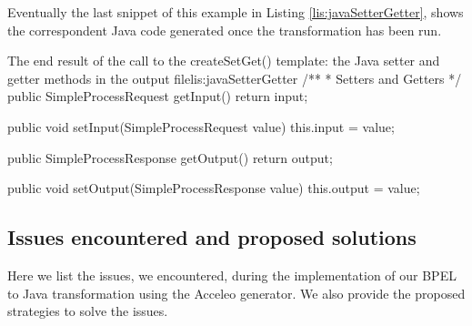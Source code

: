 Eventually the last snippet of this example in Listing \ref{lis:javaSetterGetter}, shows the correspondent Java code generated once the transformation has been run.

\begin{center}
  \begin{minipage}{1\textwidth}
    \begin{java-code}{The end result of the call to the createSetGet() template: the Java setter and getter methods in the output file}{lis:javaSetterGetter}
    /**
     * Setters and Getters    
     */
public SimpleProcessRequest getInput() {
	return input;
}

public void setInput(SimpleProcessRequest value) { 
	this.input = value;
}

public SimpleProcessResponse getOutput() {
	return output;
}

public void setOutput(SimpleProcessResponse value) {
	this.output = value;
}	
    \end{java-code}
  \end{minipage}
\end{center}



\subsection{Issues encountered and proposed solutions}
\label{sec:issues}
Here we list the issues, we encountered, during the implementation of our BPEL to Java transformation using the Acceleo generator. We also provide the proposed strategies to solve the issues.
